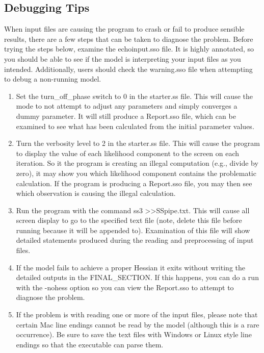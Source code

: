 \subsection{Debugging Tips}
When input files are causing the program to crash or fail to produce sensible results, there are a few steps that can be taken to diagnose the problem. Before trying the steps below, examine the echoinput.sso file. It is highly annotated, so you should be able to see if the model is interpreting your input files as you intended.  Additionally, users should check the warning.sso file when attempting to debug a non-running model.

\begin{enumerate}
	\item Set the turn\_off\_phase switch to 0 in the starter.ss file. This will cause the mode to not attempt to adjust any parameters and simply converges a dummy parameter. It will still produce a Report.sso file, which can be examined to see what has been calculated from the initial parameter values.
	\item Turn the verbosity level to 2 in the starter.ss file. This will cause the program to display the value of each likelihood component to the screen on each iteration. So it the program is creating an illegal computation (e.g., divide by zero), it may show you which likelihood component contains the problematic calculation. If the program is producing a Report.sso file, you may then see which observation is causing the illegal calculation.
	\item Run the program with the command ss3 >>SSpipe.txt. This will cause all screen display to go to the specified text file (note, delete this file before running because it will be appended to). Examination of this file will show detailed statements produced during the reading and preprocessing of input files.
	\item If the model fails to achieve a proper Hessian it exits without writing the detailed outputs in the FINAL\_SECTION. If this happens, you can do a run with the -nohess option so you can view the Report.sso to attempt to diagnose the problem.
	\item If the problem is with reading one or more of the input files, please note that certain Mac line endings cannot be read by the model (although this is a rare occurrence). Be sure to save the text files with Windows or Linux style line endings so that the executable can parse them.
\end{enumerate}


